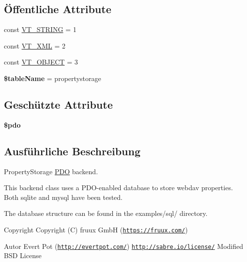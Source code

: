 \subsection*{Öffentliche Attribute}
\begin{DoxyCompactItemize}
\item 
const \mbox{\hyperlink{class_sabre_1_1_d_a_v_1_1_property_storage_1_1_backend_1_1_p_d_o_a1c1d300c389f2337cc8e610de8c46c3c}{V\+T\+\_\+\+S\+T\+R\+I\+NG}} = 1
\item 
const \mbox{\hyperlink{class_sabre_1_1_d_a_v_1_1_property_storage_1_1_backend_1_1_p_d_o_a03101c80f35d3787aaed5ff22bcfaed8}{V\+T\+\_\+\+X\+ML}} = 2
\item 
const \mbox{\hyperlink{class_sabre_1_1_d_a_v_1_1_property_storage_1_1_backend_1_1_p_d_o_aee2592e566687f40435995bc8a951cab}{V\+T\+\_\+\+O\+B\+J\+E\+CT}} = 3
\item 
\mbox{\label{class_sabre_1_1_d_a_v_1_1_property_storage_1_1_backend_1_1_p_d_o_a44a7d9d4b6ad13df1c2f36b590d8db45}} 
{\bfseries \$table\+Name} = \textquotesingle{}propertystorage\textquotesingle{}
\end{DoxyCompactItemize}
\subsection*{Geschützte Attribute}
\begin{DoxyCompactItemize}
\item 
\mbox{\label{class_sabre_1_1_d_a_v_1_1_property_storage_1_1_backend_1_1_p_d_o_ab9c80e3b74e7bc4c2200f0324e2ddb15}} 
{\bfseries \$pdo}
\end{DoxyCompactItemize}


\subsection{Ausführliche Beschreibung}
Property\+Storage \mbox{\hyperlink{class_sabre_1_1_d_a_v_1_1_property_storage_1_1_backend_1_1_p_d_o}{P\+DO}} backend.

This backend class uses a P\+D\+O-\/enabled database to store webdav properties. Both sqlite and mysql have been tested.

The database structure can be found in the examples/sql/ directory.

\begin{DoxyCopyright}{Copyright}
Copyright (C) fruux GmbH (\href{https://fruux.com/}{\tt https\+://fruux.\+com/}) 
\end{DoxyCopyright}
\begin{DoxyAuthor}{Autor}
Evert Pot (\href{http://evertpot.com/}{\tt http\+://evertpot.\+com/})  \href{http://sabre.io/license/}{\tt http\+://sabre.\+io/license/} Modified B\+SD License 
\end{DoxyAuthor}


